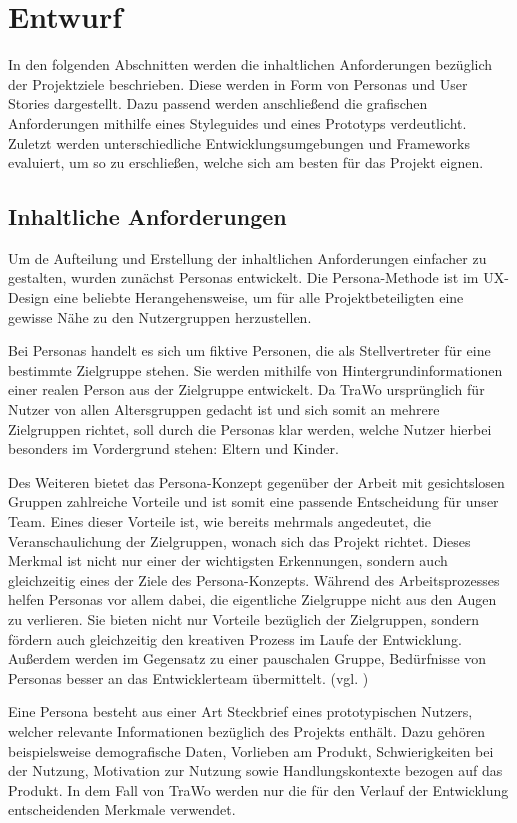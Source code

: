 \chapter{Entwurf}\label{ch:entwurf}
In den folgenden Abschnitten werden die inhaltlichen Anforderungen bezüglich der Projektziele beschrieben. Diese werden in Form von Personas und User Stories dargestellt. Dazu passend werden anschließend die grafischen Anforderungen mithilfe eines Styleguides und eines Prototyps verdeutlicht. Zuletzt werden unterschiedliche Entwicklungsumgebungen und Frameworks evaluiert, um so zu erschließen, welche sich am besten für das Projekt eignen.

\section{Inhaltliche Anforderungen}\label{inhaltliche_anforderungen}
Um de Aufteilung und Erstellung der inhaltlichen Anforderungen einfacher zu gestalten, wurden zunächst Personas entwickelt. Die Persona-Methode ist im UX-Design eine beliebte Herangehensweise, um für alle Projektbeteiligten eine gewisse Nähe zu den Nutzergruppen herzustellen.

Bei Personas handelt es sich um fiktive Personen, die als Stellvertreter für eine bestimmte Zielgruppe stehen. Sie werden mithilfe von Hintergrundinformationen einer realen Person aus der Zielgruppe entwickelt. Da TraWo ursprünglich für Nutzer von allen Altersgruppen gedacht ist und sich somit an mehrere Zielgruppen richtet, soll durch die Personas klar werden, welche Nutzer hierbei besonders im Vordergrund stehen: Eltern und Kinder.

Des Weiteren bietet das Persona-Konzept gegenüber der Arbeit mit gesichtslosen Gruppen zahlreiche Vorteile und ist somit eine passende Entscheidung für unser Team. Eines dieser Vorteile ist, wie bereits mehrmals angedeutet, die Veranschaulichung der Zielgruppen, wonach sich das Projekt richtet. Dieses Merkmal ist nicht nur einer der wichtigsten Erkennungen, sondern auch gleichzeitig eines der Ziele des Persona-Konzepts. Während des Arbeitsprozesses helfen Personas vor allem dabei, die eigentliche Zielgruppe nicht aus den Augen zu verlieren. Sie bieten nicht nur Vorteile bezüglich der Zielgruppen, sondern fördern auch gleichzeitig den kreativen Prozess im Laufe der Entwicklung. Außerdem werden im Gegensatz zu einer pauschalen Gruppe, Bedürfnisse von Personas besser an das Entwicklerteam übermittelt. (vgl. \cite{Personas})

Eine Persona besteht aus einer Art Steckbrief eines prototypischen Nutzers, welcher relevante Informationen bezüglich des Projekts enthält. Dazu gehören beispielsweise demografische Daten, Vorlieben am Produkt, Schwierigkeiten bei der Nutzung, Motivation zur Nutzung sowie Handlungskontexte bezogen auf das Produkt. In dem Fall von TraWo werden nur die für den Verlauf der Entwicklung entscheidenden Merkmale verwendet.

